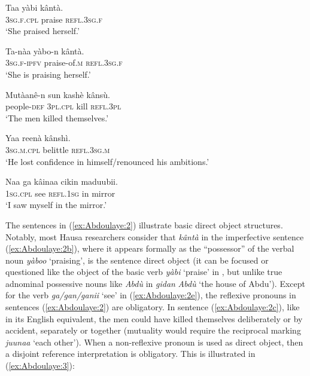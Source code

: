 \documentclass[output=paper]{langscibook}
\begin{document}
\ea%
    \label{ex:Abdoulaye:2}
    \ea\label{ex:Abdoulaye:2a}
        \gll Taa  yàbi  kântà.\\
     \textsc{3sg.f.cpl}  praise  \textsc{refl.3sg.f}\\
        \glt `She praised herself.’
        
    \ex \label{ex:Abdoulaye:2b}
    \gll Ta-nàa  yàbo-n  kântà.\\
    \textsc{3sg.f-ipfv}   praise-of.\textsc{m}  \textsc{refl.3sg.f}\\
    \glt`She is praising herself.’
    
    \ex \label{ex:Abdoulaye:2c}
    \gll Mutàanê-n  sun  kashè  kânsù.\\
    people-\textsc{def}  \textsc{3pl.cpl}  kill  \textsc{refl.3pl}\\
     \glt `The men killed themselves.’
     
    \ex \label{ex:Abdoulaye:2d} 
    \gll Yaa  reenà  kânshì.\\
    \textsc{3sg.m.cpl}  belittle  \textsc{refl.3sg.m}\\
    \glt `He lost confidence in himself/renounced his ambitions.’
    
    \ex \label{ex:Abdoulaye:2e}
    \gll  Naa  ga  kâinaa  cikin  maduubii.\\
    \textsc{1sg.cpl}  see  \textsc{refl.1sg}  in  mirror\\
    \glt  `I saw myself in the mirror.’
    \z
\z 

The sentences in (\ref{ex:Abdoulaye:2}) illustrate basic direct object structures. Notably, most Hausa researchers consider that \textit{kântà} in the imperfective sentence (\ref{ex:Abdoulaye:2b}), where it appears formally as the “possessor” of the verbal noun \textit{yàboo} ‘praising’, is the sentence direct object (it can be focused or questioned like the object of the basic verb \textit{yàbi} ‘praise’ in , but unlike true adnominal possessive nouns like \textit{Abdù} in \textit{gidan} \textit{Abdù} ‘the house of Abdu’). Except for the verb \textit{ga/gan/ganii} ‘see’ in (\ref{ex:Abdoulaye:2e}), the reflexive pronouns in sentences (\ref{ex:Abdoulaye:2}) are obligatory. In sentence (\ref{ex:Abdoulaye:2c}), like in its English equivalent, the men could have killed themselves deliberately or by accident, separately or together (mutuality would require the reciprocal marking \textit{juunaa} ‘each other’). When a non-reflexive pronoun is used as direct object, then a disjoint reference interpretation is obligatory. This is illustrated in (\ref{ex:Abdoulaye:3}):
\end{document}
